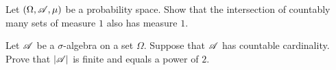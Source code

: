 \section{\problemhead}
\begin{dproblem}
	Let $(\Omega, \mathscr A, \mu)$ be a probability space.
	Show that the intersection of countably many sets of measure $1$
	also has measure $1$.
\end{dproblem}

\begin{problem}
	\gim
	Let $\mathscr A$ be a $\sigma$-algebra on a set $\Omega$.
	Suppose that $\mathscr A$ has countable cardinality.
	Prove that $|\mathscr A|$ is finite and equals a power of $2$.
\end{problem}
